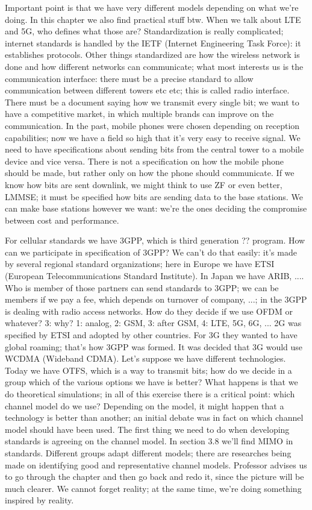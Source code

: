 {{{{Important point is that we have very different models depending on what we're doing.
In this chapter we also find practical stuff btw. When we talk about LTE and 5G, who defines what those are?
Standardization is really complicated; internet standards is handled by the IETF (Internet Engineering Task Force): it establishes protocols. Other things standardized are how the wireless network is done and how different networks can communicate; what most interests us is the communication interface: there must be a precise standard to allow communication between different towers etc etc; this is called radio interface.
There must be a document saying how we transmit every single bit; we want to have a competitive market, in which multiple brands can improve on the communication.
In the past, mobile phones were chosen depending on reception capabilities; now we have a field so high that it's very easy to receive signal.
We need to have specifications about sending bits from the central tower to a mobile device and vice versa.
There is not a specification on how the mobile phone should be made, but rather only on how the phone should communicate.
If we know how bits are sent downlink, we might think to use ZF or even better,
LMMSE; it must be specified how bits are sending data to the base stations.
We can make base stations however we want: we're the ones deciding the compromise between cost and performance.

For cellular standards we have 3GPP, which is third generation ?? program. How can we participate in specification of 3GPP? We can't do that easily: it's made by several regional standard organizations;
here in Europe we have ETSI
(European Telecommunications Standard Institute). In Japan we have ARIB, ....
Who is member of those partners can send standards to 3GPP; we can be members if we pay a fee, which depends on turnover of company, ...; in the 3GPP is dealing with radio access networks. How do they decide if we use OFDM or whatever?
3: why? 1: analog, 2: GSM, 3: after GSM, 4: LTE, 5G, 6G, ...
2G was specified by ETSI and adopted by other countries. For 3G they wanted to have global roaming; that's how 3GPP was formed.
It was decided that 3G would use WCDMA (Wideband CDMA). Let's suppose we have different technologies.
Today we have OTFS, which is a way to transmit bits; how do we decide in a group which of the various options we have is better? What happens is that we do theoretical simulations; in all of this exercise there is a critical point: which channel model do we use? Depending on the model, it might happen that a technology is better than another;
an initial debate was in fact on which channel model should have been used. The first thing we need to do when developing standards is agreeing on the channel model.
In section 3.8 we'll find MIMO in standards.
Different groups adapt different models; there are researches being made on identifying good and representative channel models.
Professor advises us to go through the chapter and then go back and redo it, since the picture will be much clearer. We cannot forget reality; at the same time, we're doing something inspired by reality.

}}}}
